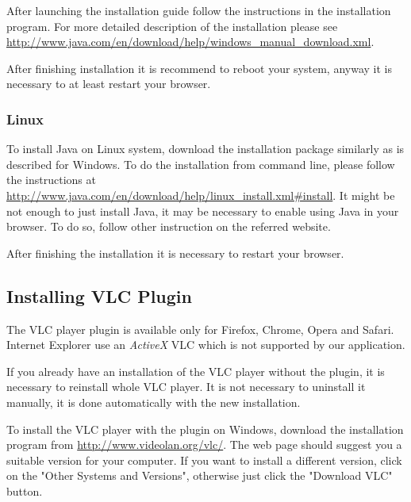 After launching the installation guide follow the instructions in the installation program. For more detailed description of the installation please see \url{http://www.java.com/en/download/help/windows_manual_download.xml}.

After finishing installation it is recommend to reboot your system, anyway it is necessary to at least restart your browser.

\subsubsection{Linux}

To install Java on Linux system, download the installation package similarly as is described for Windows. To do the installation from command line, please follow the instructions at \url{http://www.java.com/en/download/help/linux_install.xml#install}. It might be not enough to just install Java, it may be necessary to enable using Java in your browser. To do so, follow other instruction on the referred website.

After finishing the installation it is necessary to restart your browser.

\subsection{Installing VLC Plugin}

The VLC player plugin is available only for Firefox, Chrome, Opera and Safari. Internet Explorer use an \emph{ActiveX} VLC which is not supported by our application.

If you already have an installation of the VLC player without the plugin, it is necessary to reinstall whole VLC player. It is not necessary to uninstall it manually, it is done automatically with the new installation.

To install the VLC player with the plugin on Windows, download the installation program from \url{http://www.videolan.org/vlc/}. The web page should suggest you a suitable version for your computer. If you want to install a different version, click on the "Other Systems and Versions", otherwise just click the "Download VLC" button.

